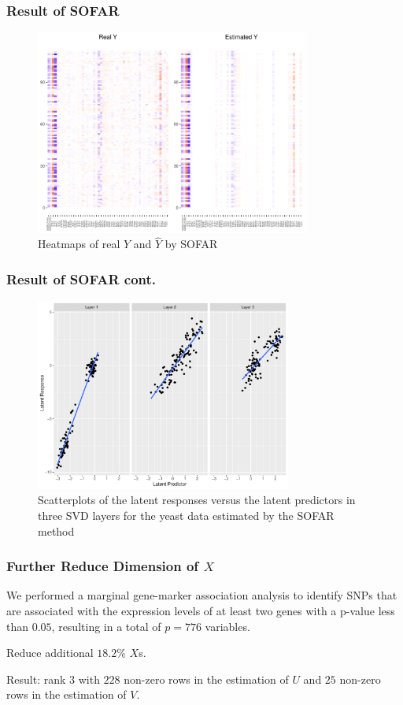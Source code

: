 \begin{frame}
    \frametitle{Result of SOFAR}
    \begin{figure}[h]
        \centering
        \includegraphics[width=0.8\textwidth]{./figs/heatmap1.pdf}
        \caption{Heatmaps of real $Y$ and $\hat{Y}$ by SOFAR}
    \end{figure}
\end{frame}

\begin{frame}
    \frametitle{Result of SOFAR cont.}
    \begin{figure}[h]
        \centering
        \includegraphics[width=0.75\textwidth]{./figs/latent1.pdf}
        \caption{Scatterplots of the latent responses versus the latent predictors in three SVD layers for the yeast data estimated by the SOFAR method}
    \end{figure}
\end{frame}


\begin{frame}
    \frametitle{Further Reduce Dimension of $X$}

    We performed a marginal gene-marker association analysis to identify SNPs that are associated with the expression levels of at least two genes with a p-value less than $0.05$, resulting in a total of $p = 776$ variables.

    Reduce additional $18.2\%$ $X$s. 

    Result: rank $3$ with $228$ non-zero rows in the estimation of $U$ and $25$ non-zero rows in the estimation of $V$. 
\end{frame}


